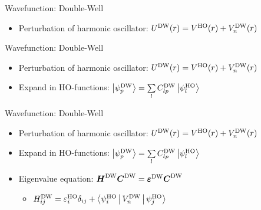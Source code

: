 \documentclass[10pt, t, xcolor=dvipsnames]{beamer}
\begin{document}
\begin{frame}[fragile]{Wavefunction: Double-Well}
    \begin{itemize}
        \item Perturbation of harmonic oscillator: $U^{\text{DW}}(r) = V^{\text{HO}}(r) + V^{\text{DW}}_n(r)$
    \end{itemize}
\end{frame}

\begin{frame}[fragile]{Wavefunction: Double-Well}
    \begin{itemize}
        \item Perturbation of harmonic oscillator: $U^{\text{DW}}(r) = V^{\text{HO}}(r) + V^{\text{DW}}_n(r)$
        \item Expand in HO-functions: $\ket{\psi^{\text{DW}}_p} = \sum\limits_{l}C^{\text{DW}}_{lp}\ket{\psi^{\text{HO}}_l}$
    \end{itemize}
\end{frame}

\begin{frame}[fragile]{Wavefunction: Double-Well}
    \begin{itemize}
        \item Perturbation of harmonic oscillator: $U^{\text{DW}}(r) = V^{\text{HO}}(r) + V^{\text{DW}}_n(r)$
        \item Expand in HO-functions: $\ket{\psi^{\text{DW}}_p} = \sum\limits_{l}C^{\text{DW}}_{lp}\ket{\psi^{\text{HO}}_l}$
        \item Eigenvalue equation: $\bm{{H}}^{\text{DW}}\bm{{C}}^{\text{DW}} =
            \bm{{\varepsilon^{\text{DW}}}}\bm{{C}}^{\text{DW}}$
            \begin{itemize}
                \item $H^{\text{DW}}_{ij} = \varepsilon^{\text{HO}}_i\delta_{ij} +
                    \Braket{\psi^{\text{HO}}_i|V^{\text{DW}}_n|\psi^{\text{HO}}_j}$
            \end{itemize}
    \end{itemize}
\end{frame}
\end{document}
